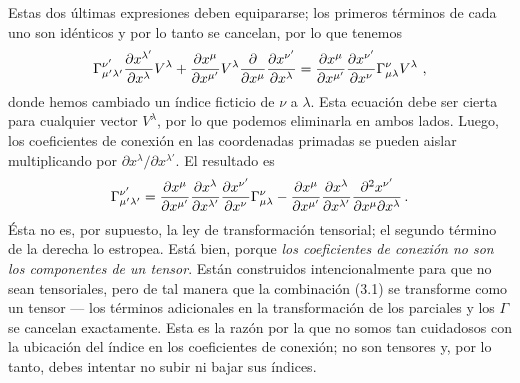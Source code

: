 \documentclass[11pt,b5paper,openany,twoside]{book}
\begin{document}
Estas dos últimas expresiones deben equipararse; los primeros términos de cada uno son idénticos y por lo tanto se cancelan, por lo que tenemos
\begin{equation}
\Gamma^{\nu'}_{\mu'\lambda'}{{\partial x^{\lambda'}}\over
{\partial x^{\lambda}}}V^{\lambda} +
{{\partial x^\mu}\over{\partial x^{\mu'}}} V^\lambda
{{\partial}\over{\partial x^{\mu}}}
{{\partial x^{\nu'}}\over{\partial x^{\lambda}}}
= {{\partial x^\mu}\over{\partial x^{\mu'}}}
{{\partial x^{\nu'}}\over{\partial x^{\nu}}}
\Gamma^\nu_{\mu\lambda}V^{\lambda}\ ,\label{3.5}
\end{equation}
donde hemos cambiado un índice ficticio de $\nu$ a $\lambda$.
Esta ecuación debe ser cierta para cualquier vector $V^\lambda$, por lo que podemos eliminarla en ambos lados.
Luego, los coeficientes de conexión en las coordenadas primadas se pueden aislar multiplicando por $\partial x^{\lambda}/\partial x^{\lambda'}$.
El resultado es
\begin{equation}
\Gamma^{\nu'}_{\mu'\lambda'} = {{\partial x^\mu}\over{\partial x^{\mu'}}}
{{\partial x^\lambda}\over{\partial x^{\lambda'}}}
{{\partial x^{\nu'}}\over{\partial x^{\nu}}} \Gamma^\nu_{\mu\lambda}
- {{\partial x^\mu}\over{\partial x^{\mu'}}}
{{\partial x^\lambda}\over{\partial x^{\lambda'}}}
{{\partial^2 x^{\nu'}}\over{\partial x^{\mu}\partial x^{\lambda}}}\,.
\label{3.6}
\end{equation}
Ésta no es, por supuesto, la ley de transformación tensorial; el segundo término de la derecha lo estropea.
Está bien, porque \textit{los coeficientes de conexión no son los componentes de un tensor}.
Están construidos intencionalmente para que no sean tensoriales, pero de tal manera que la combinación (3.1) se transforme como un tensor --- los términos adicionales en la transformación de los parciales y los $\Gamma$ se cancelan exactamente.
Esta es la razón por la que no somos tan cuidadosos con la ubicación del índice en los coeficientes de conexión; no son tensores y, por lo tanto, debes intentar no subir ni bajar sus índices.
\end{document}
